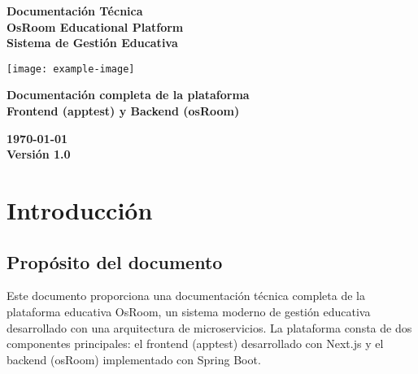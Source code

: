 \documentclass[12pt,a4paper]{report}
\begin{document}
\begin{titlepage}
    \begin{center}
        \vspace*{4cm}
        
        \textbf{\LARGE Documentación Técnica}\\
        \vspace{1.5cm}
        \textbf{\Huge OsRoom Educational Platform}\\
        \vspace{0.5cm}
        \textbf{\large Sistema de Gestión Educativa}\\
        \vspace{1.5cm}
        
        \texttt{[image: example-image]}\\
        \vspace{1.5cm}
        
        \textbf{\Large Documentación completa de la plataforma}\\
        \vspace{0.8cm}
        \textbf{\large Frontend (apptest) y Backend (osRoom)}\\
        \vspace{2cm}
        
        \textbf{\today}\\
        \vspace{0.5cm}
        \textbf{Versión 1.0}\\
    \end{center}
\end{titlepage}

\tableofcontents
\listoffigures
\listoftables

\chapter{Introducción}
\section{Propósito del documento}
Este documento proporciona una documentación técnica completa de la plataforma educativa OsRoom, un sistema moderno de gestión educativa desarrollado con una arquitectura de microservicios. La plataforma consta de dos componentes principales: el frontend (apptest) desarrollado con Next.js y el backend (osRoom) implementado con Spring Boot.
\end{document}
